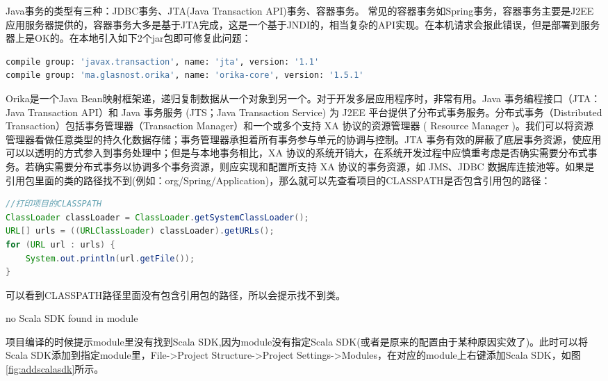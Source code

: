 \documentclass[12pt]{book}
\makeatletter
\numberwithin{dummy}{section}
\theoremstyle{ocrenumbox}
\theoremstyle{blacknumex}
\theoremstyle{blacknumbox}
\theoremstyle{ocrenum}
\renewcommand\paragraph{\@startsection{paragraph}{4}{\z@}
	{-2ex \@plus-.2ex \@minus .2ex}
	{.1ex}
	{\normalfont\small\sffamily\bfseries}}
\makeatother
\begin{document}
Java事务的类型有三种：JDBC事务、JTA(Java Transaction API)事务、容器事务。 常见的容器事务如Spring事务，容器事务主要是J2EE应用服务器提供的，容器事务大多是基于JTA完成，这是一个基于JNDI的，相当复杂的API实现。在本机请求会报此错误，但是部署到服务器上是OK的。在本地引入如下2个jar包即可修复此问题：

\begin{lstlisting}[language=Bash]
compile group: 'javax.transaction', name: 'jta', version: '1.1'
compile group: 'ma.glasnost.orika', name: 'orika-core', version: '1.5.1'
\end{lstlisting}

Orika是一个Java Bean映射框架递，递归复制数据从一个对象到另一个。对于开发多层应用程序时，非常有用。Java 事务编程接口（JTA：Java Transaction API）和 Java 事务服务 (JTS；Java Transaction Service) 为 J2EE 平台提供了分布式事务服务。分布式事务（Distributed Transaction）包括事务管理器（Transaction Manager）和一个或多个支持 XA 协议的资源管理器 ( Resource Manager )。我们可以将资源管理器看做任意类型的持久化数据存储；事务管理器承担着所有事务参与单元的协调与控制。JTA 事务有效的屏蔽了底层事务资源，使应用可以以透明的方式参入到事务处理中；但是与本地事务相比，XA 协议的系统开销大，在系统开发过程中应慎重考虑是否确实需要分布式事务。若确实需要分布式事务以协调多个事务资源，则应实现和配置所支持 XA 协议的事务资源，如 JMS、JDBC 数据库连接池等。如果是引用包里面的类的路径找不到(例如：org/Spring/Application)，那么就可以先查看项目的CLASSPATH是否包含引用包的路径：

\begin{lstlisting}[language=Java]
//打印项目的CLASSPATH
ClassLoader classLoader = ClassLoader.getSystemClassLoader();
URL[] urls = ((URLClassLoader) classLoader).getURLs();
for (URL url : urls) {
	System.out.println(url.getFile());
}
\end{lstlisting}

可以看到CLASSPATH路径里面没有包含引用包的路径，所以会提示找不到类。

\paragraph{no Scala SDK found in module}

项目编译的时候提示module里没有找到Scala SDK,因为module没有指定Scala SDK(或者是原来的配置由于某种原因实效了)。此时可以将Scala SDK添加到指定module里，File->Project Structure->Project Settings->Modules，在对应的module上右键添加Scala SDK，如图\ref{fig:addscalasdk}所示。
\end{document}
